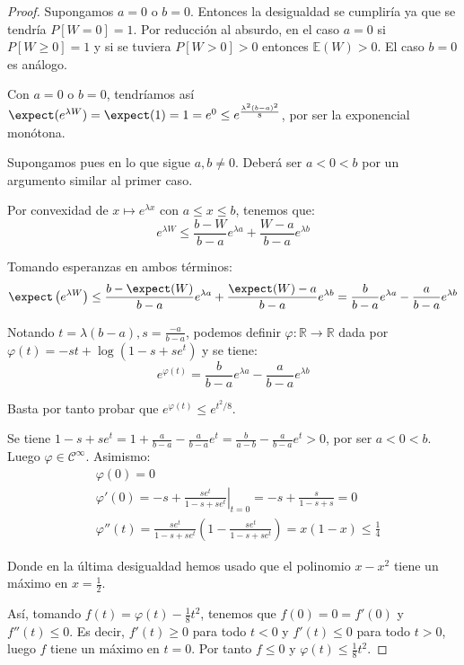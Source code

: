 \begin{proof}
 Supongamos $a=0$ o $b=0$. Entonces la desigualdad se cumpliría ya que se tendría $P[W=0]=1$. Por
 reducción al absurdo, en el caso $a=0$ si $P[W\ge 0] = 1$ y si se tuviera $P[W>0] > 0$ entonces $\mathbb{E}(W) > 0$.
 El caso $b=0$ es análogo.
 
 Con $a=0$ o $b=0$, tendríamos así $\expect(e^{\lambda W}) = \expect(1) = 1 = e^0 \le e^{\frac{\lambda^2 (b-a)^2}{8}}$, 
 por ser la exponencial monótona. 
 
 Supongamos pues en lo que sigue $a, b\neq 0$. Deberá ser $a < 0 < b$ por un argumento similar al
 primer caso.
 
 Por convexidad de $x\mapsto e^{\lambda x}$ con $a\le x \le b$, tenemos que:
 \[
   e^{\lambda W} \le \frac{b-W}{b-a} e^{\lambda a} + \frac{W-a}{b-a}e^{\lambda b}
 \]

 Tomando esperanzas en ambos términos: 
 \[
   \expect \left(e^{\lambda W}\right) \le \frac{b-\expect(W)}{b-a} e^{\lambda a} + 
   \frac{\expect(W)-a}{b-a}e^{\lambda b} = \frac{b}{b-a} e^{\lambda a} - \frac{a}{b-a} e^{\lambda b}
 \]
 
 Notando $t = \lambda(b-a), s = \frac{-a}{b-a}$, podemos definir $\varphi : \mathbb{R} \rightarrow \mathbb{R}$
 dada por $\varphi(t) = -st + \log(1-s+se^t)$ y se tiene:
 \[
   e^{\varphi(t)} = \frac{b}{b-a} e^{\lambda a} - \frac{a}{b-a} e^{\lambda b}
 \]
 
 Basta por tanto probar que $e^{\varphi(t)} \le e^{t^2/8}$.
 
 Se tiene $1-s+se^t = 1 + \frac{a}{b-a} - \frac{a}{b-a} e^t = \frac{b}{a-b} - \frac{a}{b-a} e^t > 0$, por
 ser $a< 0 < b$. Luego $\varphi\in \mathcal{C}^{\infty}$. Asimismo:
 \begin{align*}
  &\varphi(0) = 0 \\  
  & \varphi'(0) = \left.-s + \frac{se^t}{1-s+se^t} \right|_{t=0} = -s + \frac{s}{1-s+s} = 0\\
  & \varphi''(t) = \frac{se^t}{1-s+se^t} \left(1-\frac{se^t}{1-s+se^t}\right) = x(1-x) \le \frac{1}{4}
 \end{align*}
 
 Donde en la última desigualdad hemos usado que el polinomio $x-x^2$ tiene un máximo en $x=\frac{1}{2}$.
 
 Así, tomando $f(t) = \varphi(t) - \frac{1}{8}t^2$, tenemos que $f(0) = 0 = f'(0)$ y $f''(t) \le 0$. Es decir, 
 $f'(t) \ge 0$ para todo $t<0$ y $f'(t) \le 0$ para todo $t > 0$, luego $f$ tiene un máximo en $t=0$. Por tanto
 $f \le 0$ y $\varphi(t) \le \frac{1}{8} t^2$.
 \end{proof}


